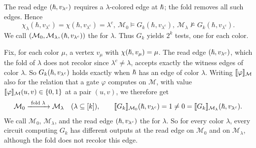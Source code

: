 The read edge $(\hslash,v_{\lambda^c})$ requires a $\lambda$-colored edge at $\hslash$; the fold removes all such edges. 
Hence
\[
\chi_\lambda(\hbar,v_{\lambda^c})
 =\chi(\hbar,v_{\lambda^c})=\lambda^c,\ 
\mathcal M_0\models G_k(\hbar,v_{\lambda^c}),\ 
\mathcal M_\lambda\not\models G_k(\hbar,v_{\lambda^c}).
\]
We call $(\mathcal M_0,\mathcal M_\lambda,(\hslash,v_{\lambda^c}))$ the  for $\lambda$.
Thus $G_k$ yields $2^k$ tests, one for each color.

Fix, for each color $\mu$, a vertex $v_\mu$ with $\chi(\hslash,v_\mu)=\mu$.
The read edge $(\hslash,v_{\lambda^c})$, which the fold of $\lambda$ does not
recolor since $\lambda^c\ne\lambda$, accepts exactly the witness edges of
color $\lambda$. So $G_k(\hslash,v_{\lambda^c})$ holds exactly when $\hslash$
has an edge of color $\lambda$. Writing $\llbracket \varphi\rrbracket_{\mathcal M}$ also for
the relation that a gate $\varphi$ computes on $\mathcal M$, with value
$\llbracket \varphi\rrbracket_{\mathcal M}(u,v)\in\{0,1\}$ at a pair $(u,v)$, we therefore
get
\[
 \mathcal M_0\xrightarrow{\ \text{fold }\lambda\ }\mathcal M_\lambda
 \quad(\lambda\subseteq[k]),\qquad
 \sem{G_k}{\mathcal M_0}(\hub,v_{\lambda^c})=1\ne0
 =\sem{G_k}{\mathcal M_\lambda}(\hub,v_{\lambda^c}).
\]
We call $\mathcal M_0$, $\mathcal M_\lambda$, and the read edge
$(\hslash,v_{\lambda^c})$ the  for $\lambda$. So for every color
$\lambda$, every circuit computing $G_k$ has different outputs at the read
edge on $\mathcal M_0$ and on $\mathcal M_\lambda$, although the fold does
not recolor this edge.
\fi





